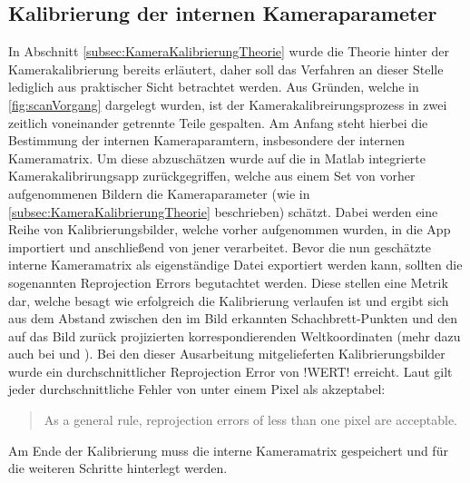 \subsection{Kalibrierung der internen Kameraparameter}
\label{subsec:interneKalibrierung}
In Abschnitt \ref{subsec:KameraKalibrierungTheorie} wurde die Theorie hinter der Kamerakalibrierung bereits erläutert, daher soll das Verfahren an dieser Stelle lediglich aus praktischer Sicht betrachtet werden. Aus Gründen, welche in \ref{fig:scanVorgang} dargelegt wurden, ist der Kamerakalibreirungsprozess in zwei zeitlich voneinander getrennte Teile gespalten. Am Anfang steht hierbei die Bestimmung der internen Kameraparamtern, insbesondere der internen Kameramatrix. Um diese abzuschätzen wurde auf die in Matlab integrierte Kamerakalibrirungsapp zurückgegriffen, welche aus einem Set von vorher aufgenommenen Bildern die Kameraparameter (wie in \ref{subsec:KameraKalibrierungTheorie} beschrieben) schätzt. Dabei werden eine Reihe von Kalibrierungsbilder, welche vorher aufgenommen wurden, in die App importiert und anschließend von jener verarbeitet. Bevor die nun geschätzte interne Kameramatrix als eigenständige Datei exportiert werden kann, sollten die sogenannten Reprojection Errors begutachtet werden. Diese stellen eine Metrik dar, welche besagt wie erfolgreich die Kalibrierung verlaufen ist und ergibt sich aus dem Abstand zwischen den im Bild erkannten Schachbrett-Punkten und den auf das Bild zurück projizierten korrespondierenden Weltkoordinaten (mehr dazu auch bei \cite{Mathworks:17} und \cite{StackOverflow:15}). Bei den dieser Ausarbeitung mitgelieferten Kalibrierungsbilder wurde ein durchschnittlicher Reprojection Error von !WERT! erreicht. Laut \cite{Mathworks:17} gilt jeder durchschnittliche Fehler von unter einem Pixel als akzeptabel:
\begin{quotation}
As a general rule, reprojection errors of less than one pixel are acceptable.
\end{quotation}
Am Ende der Kalibrierung muss die interne Kameramatrix gespeichert und für die weiteren Schritte hinterlegt werden.  

